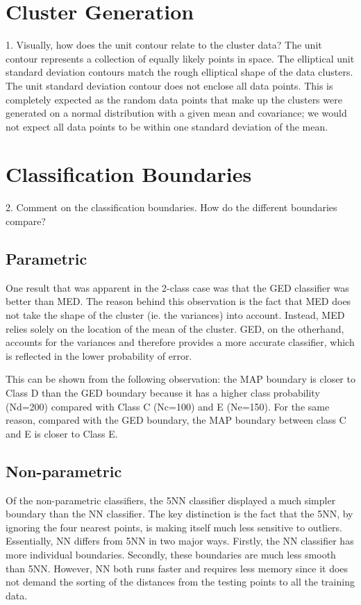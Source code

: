 \section{Cluster Generation}
1.	Visually, how does the unit contour relate to the cluster data?
The unit contour represents a collection of equally likely points in space. The elliptical unit standard deviation contours match the rough elliptical shape of the data clusters. The unit standard deviation contour does not enclose all data points.  This is completely expected as the random data points that make up the clusters were generated on a normal distribution with a given mean and covariance; we would not expect all data points to be within one standard deviation of the mean.  

\section{Classification Boundaries}

2.	Comment on the classification boundaries. How do the different boundaries compare?

\subsection{Parametric}

One result that was apparent in the 2-class case was that the GED classifier was better than MED.  The reason behind this observation is the fact that MED does not take the shape of the cluster (ie. the variances) into account.  Instead, MED relies solely on the location of the mean of the cluster. GED, on the otherhand, accounts for the variances and therefore provides a more accurate classifier, which is reflected in the lower probability of error. 

This can be shown from the following observation: the MAP boundary is closer to Class D than the GED boundary because it has a higher class probability (Nd=200) compared with Class C (Nc=100) and E (Ne=150). For the same reason, compared with the GED boundary, the MAP boundary between class C and E is closer to Class E.

\subsection{Non-parametric}

Of the non-parametric classifiers, the 5NN classifier displayed a much simpler boundary than the NN classifier.  The key distinction is the fact that the 5NN, by ignoring the four nearest points, is making itself much less sensitive to outliers. Essentially, NN differs from 5NN in two major ways. Firstly, the NN classifier has more individual boundaries. Secondly, these boundaries are much less smooth than 5NN. However, NN both runs faster and requires less memory since it does not demand the sorting of the distances from the testing points to all the training data.

